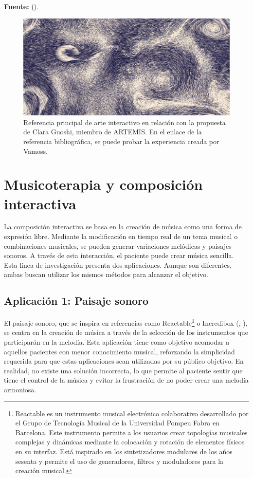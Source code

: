 \begin{center}
	\textbf{Fuente:} \citeauthor{VAMOSS:2023} (\citeyear{VAMOSS:2023}).
	\vspace{-18pt}
\end{center}

\begin{figure}[h!]
	\centering
	\includegraphics[width=0.4\linewidth]{Figuras/Desarrollo/MarParticulas.png}
	\caption{Referencia principal de arte interactivo en relación con la propuesta de Clara Guoshi, miembro de ARTEMIS. En el enlace de la referencia bibliográfica, se puede probar la experiencia creada por Vamoss.}
	\label{fig:SeaParticles}
\end{figure}

\section{Musicoterapia y composición interactiva}

La composición interactiva se basa en la creación de música como una forma de expresión libre. Mediante la modificación en tiempo real de un tema musical o combinaciones musicales, se pueden generar variaciones melódicas y paisajes sonoros. A través de esta interacción, el paciente puede crear música sencilla. Esta línea de investigación presenta dos aplicaciones. Aunque son diferentes, ambas buscan utilizar los mismos métodos para alcanzar el objetivo.

\subsection{Aplicación 1: Paisaje sonoro}

El paisaje sonoro, que se inspira en referencias como Reactable\footnote{Reactable es un instrumento musical electrónico colaborativo desarrollado por el Grupo de Tecnología Musical de la Universidad Pompeu Fabra en Barcelona. Este instrumento permite a los usuarios crear topologías musicales complejas y dinámicas mediante la colocación y rotación de elementos físicos en su interfaz. Está inspirado en los sintetizadores modulares de los años sesenta y permite el uso de generadores, filtros y moduladores para la creación musical.} o Incredibox (\citeauthor{INCREDIBOX:2023}, \citeyear{INCREDIBOX:2023}), se centra en la creación de música a través de la selección de los instrumentos que participarán en la melodía. Esta aplicación tiene como objetivo acomodar a aquellos pacientes con menor conocimiento musical, reforzando la simplicidad requerida para que estas aplicaciones sean utilizadas por su público objetivo. En realidad, no existe una solución incorrecta, lo que permite al paciente sentir que tiene el control de la música y evitar la frustración de no poder crear una melodía armoniosa.

